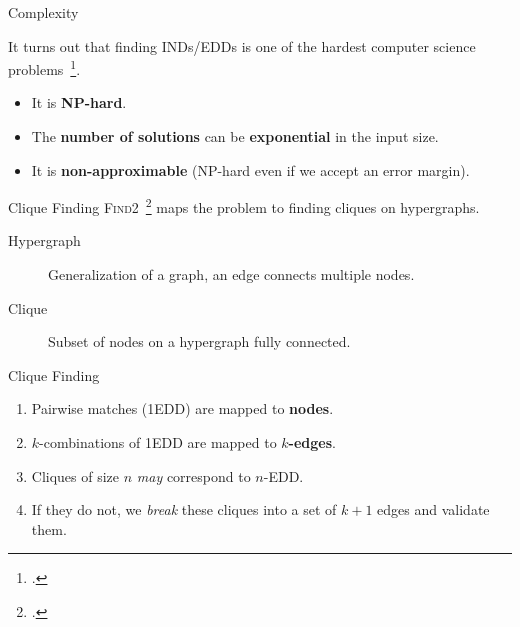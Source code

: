 \documentclass[10pt]{beamer}
\begin{document}
\begin{frame}{Complexity}

    It turns out that finding INDs/EDDs is one of the hardest computer science
    problems~\footcite{Blsius2017}.
    
    \begin{itemize}
        \item It is \textbf{NP-hard}.
        \item The \textbf{number of solutions} can be \textbf{exponential} in the input size.
        \item It is \textbf{non-approximable} (NP-hard even if we accept an error margin).
    \end{itemize}
    
    \bigskip

\end{frame}

\begin{frame}{Clique Finding}
    \textsc{Find2}~\footcite{koeller2003discovery} maps the problem to finding cliques on hypergraphs.
    \begin{description}
        \item[Hypergraph] Generalization of a graph, an edge connects multiple nodes.
        \item[Clique] Subset of nodes on a hypergraph fully connected.
    \end{description}
\end{frame}

\begin{frame}{Clique Finding}
    \begin{enumerate}
        \item Pairwise matches (1EDD) are mapped to \textbf{nodes}.
        \item $k$-combinations of 1EDD are mapped to \textbf{$k$-edges}.
        \item Cliques of size $n$ \emph{may} correspond to $n$-EDD.
        \item If they do not, we \emph{break} these cliques into a set of $k+1$ edges and
            validate them.
    \end{enumerate}
\end{frame}
\end{document}
